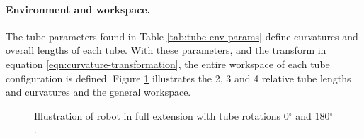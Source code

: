 \paragraph{Environment and workspace.} The tube parameters found in Table \ref{tab:tube-env-params} define curvatures and overall lengths of each tube. With these parameters, and the transform in equation \ref{eqn:curvature-transformation}, the entire workspace of each tube configuration is defined. Figure \ref{fig:workspace} illustrates the 2, 3 and 4 relative tube lengths and curvatures and the general workspace.

\begin{figure}
    \caption{Illustration of robot in full extension with tube rotations 0$^{\circ}$ and 180$^{\circ}$.}
    \label{fig:workspace}
\end{figure}

